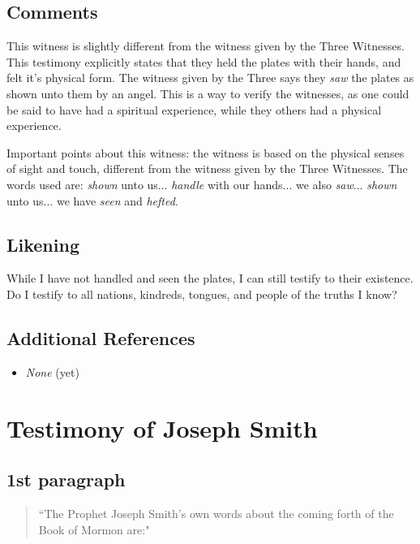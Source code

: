 \documentclass[12pt]{report}
\begin{document}
\subsection{Comments\label{8witness:comments}}
This witness is slightly different from the witness given by the Three Witnesses.  This testimony explicitly states that they held the plates with their hands, and felt it's physical form.  The witness given by the Three says they \emph{saw} the plates as shown unto them by an angel.  This is a way to verify the witnesses, as one could be said to have had a spiritual experience, while they others had a physical experience.

Important points about this witness: the witness is based on the physical senses of sight and touch, different from the witness given by the Three Witnesses.  The words used are: \emph{shown} unto us... \emph{handle} with our hands... we also \emph{saw}... \emph{shown} unto us... we have \emph{seen} and \emph{hefted}.

\subsection{Likening\label{8witness:likening}}
While I have not handled and seen the plates, I can still testify to their existence. Do I testify to all nations, kindreds, tongues, and people of the truths I know?

\subsection{Additional References\label{8witness:references}}
\begin{itemize}
\item \emph{None} (yet)
\end{itemize}

\section{Testimony of Joseph Smith\label{JStestimony}}
\subsection{1st paragraph\label{js:1st}}
\begin{center}
\begin{quote}
``The Prophet Joseph Smith's own words about the coming forth of the Book of Mormon are:"
\end{quote}
\end{center}
\end{document}

